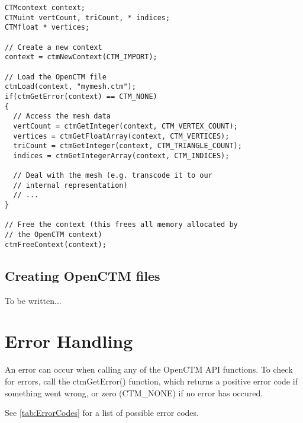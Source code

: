 \begin{lstlisting}
CTMcontext context;
CTMuint vertCount, triCount, * indices;
CTMfloat * vertices;

// Create a new context
context = ctmNewContext(CTM_IMPORT);

// Load the OpenCTM file
ctmLoad(context, "mymesh.ctm");
if(ctmGetError(context) == CTM_NONE)
{
  // Access the mesh data
  vertCount = ctmGetInteger(context, CTM_VERTEX_COUNT);
  vertices = ctmGetFloatArray(context, CTM_VERTICES);
  triCount = ctmGetInteger(context, CTM_TRIANGLE_COUNT);
  indices = ctmGetIntegerArray(context, CTM_INDICES);

  // Deal with the mesh (e.g. transcode it to our
  // internal representation)
  // ...
}

// Free the context (this frees all memory allocated by
// the OpenCTM context)
ctmFreeContext(context);
\end{lstlisting}


\section{Creating OpenCTM files}
To be written...




\chapter{Error Handling}
An error can occur when calling any of the OpenCTM API functions. To check
for errors, call the ctmGetError() function, which returns a positive error
code if something went wrong, or zero (CTM\_NONE) if no error has occured.

See \ref{tab:ErrorCodes} for a list of possible error codes.

